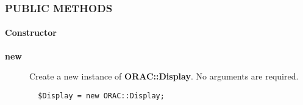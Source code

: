 \subsubsection*{PUBLIC METHODS\label{ORAC::Display_PUBLIC_METHODS}}\paragraph*{Constructor\label{ORAC::Display_Constructor}}\begin{description}
\item[\textbf{new}] \mbox{}

Create a new instance of \textbf{ORAC::Display}. No arguments are
required.

\begin{verbatim}
  $Display = new ORAC::Display;
\end{verbatim}
\end{description}
